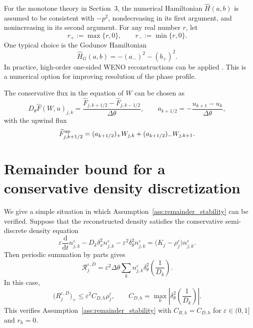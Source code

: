 \documentclass[11pt]{article}
\numberwithin{equation}{section}
\begin{document}
For the monotone theory in Section~3, the numerical Hamiltonian
\(\widehat H(a,b)\) is assumed to be consistent with \(-p^2\), nondecreasing in
its first argument, and nonincreasing in its second argument. For any real number \(r\), let
\[
    r_+ := \max\{r,0\},\qquad r_- := \min\{r,0\}.
\]
One typical 
choice is the Godunov Hamiltonian
\begin{equation}
\label{eq:app_Godunov_H}
    \widehat H_G(a,b)
    =
    -(a_-)^2-(b_+)^2.
\end{equation}
In practice, high-order one-sided WENO reconstructions can be applied \cite{JiangPeng, OsherShu, ShuHJ}.  
This is a numerical option for
improving resolution of the phase profile.  

The conservative flux in the equation of $W$ can be chosen as 
\[
    D_\theta\widehat F(W,u)_{j,k}
    =
    \frac{\widehat F_{j,k+1/2}-\widehat F_{j,k-1/2}}{\Delta\theta},
    \qquad
    a_{k+1/2}
    =
    -\frac{u_{k+1}-u_k}{\Delta\theta},
\]
with the upwind flux 
\begin{equation}
\label{eq:app_upwind_flux}
    \widehat F^{\rm up}_{j,k+1/2}
    =
    (a_{k+1/2})_+ W_{j,k}
    +
    (a_{k+1/2})_- W_{j,k+1}.
\end{equation}


\section{Remainder bound for a conservative density discretization}
\label{app:remainder}


We give a simple situation in which Assumption~\ref{ass:remainder_stability} can be
verified.  Suppose that the reconstructed density satisfies the conservative
semi-discrete density equation
\begin{equation}
\label{eq:app_density_compatible_n}
    \varepsilon\frac{\mathrm d}{\mathrm dt}n_{j,k}^\varepsilon
    -
    D_k\delta_x^2 n_{j,k}^\varepsilon
    -
    \varepsilon^2\delta_\theta^2 n_{j,k}^\varepsilon
    =
    \bigl(K_j-\rho_{j}^\varepsilon\bigr)n_{j,k}^\varepsilon .
\end{equation}
Then periodic summation by parts gives
\[
    \mathcal R_j^{\varepsilon,D}
    =
    \varepsilon^2\Delta\theta
    \sum_k
    n_{j,k}^\varepsilon
    \delta_\theta^2\left(\frac{1}{D_k}\right).
\]
In this case, 
\[
    \bigl(R_j^{\varepsilon,D}\bigr)_+
    \le
    \varepsilon^2 C_{D,h}\rho_j^\varepsilon,
    \qquad
    C_{D,h}
    =
    \max_k
    \left|
    \delta_\theta^2\left(\frac{1}{D_k}\right)
    \right|.
\]
This verifies Assumption~\ref{ass:remainder_stability} with \(C_{R,h}=C_{D,h}\) for $\varepsilon\in(0,1]$ and
\(r_h=0\). 
\end{document}
